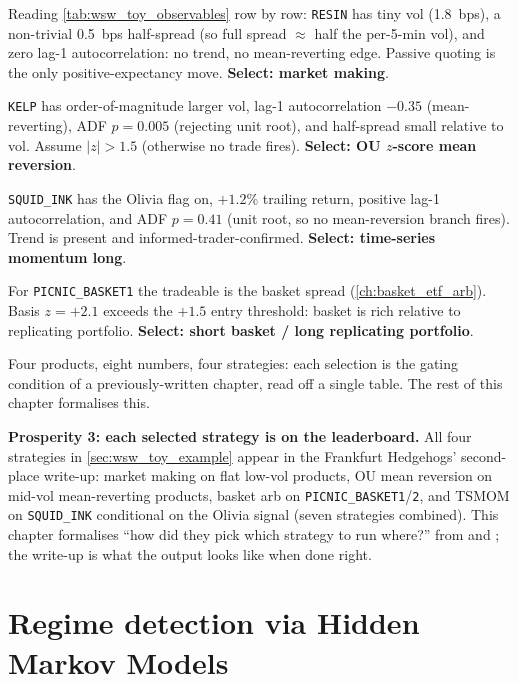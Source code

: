 Reading \cref{tab:wsw_toy_observables} row by row: \texttt{RESIN}
has tiny vol (1.8~bps), a non-trivial 0.5~bps half-spread (so full
spread $\approx$ half the per-5-min vol), and zero lag-1
autocorrelation: no trend, no mean-reverting edge. Passive
quoting is the only positive-expectancy move. \textbf{Select:
market making}.

\texttt{KELP} has order-of-magnitude larger vol, lag-1
autocorrelation $-0.35$ (mean-reverting), ADF $p = 0.005$
(rejecting unit root), and half-spread small relative to vol. Assume
$|z| > 1.5$ (otherwise no trade fires). \textbf{Select: OU
$z$-score mean reversion}.

\texttt{SQUID\_INK} has the Olivia flag on, $+1.2\%$ trailing
return, positive lag-1 autocorrelation, and ADF $p = 0.41$ (unit
root, so no mean-reversion branch fires). Trend is present and
informed-trader-confirmed. \textbf{Select: time-series momentum
long}.

For \texttt{PICNIC\_BASKET1} the tradeable is the basket spread
(\cref{ch:basket_etf_arb}). Basis $z = +2.1$ exceeds the $+1.5$
entry threshold: basket is rich relative to replicating portfolio.
\textbf{Select: short basket / long replicating portfolio}.

Four products, eight numbers, four strategies: each selection is
the gating condition of a previously-written chapter, read off a
single table. The rest of this chapter formalises this.

\begin{prosperitybox}
\textbf{Prosperity 3: each selected strategy is on the leaderboard.}
All four strategies in \cref{sec:wsw_toy_example} appear in the
Frankfurt Hedgehogs' second-place write-up: market making on flat
low-vol products, OU mean reversion on mid-vol mean-reverting
products, basket arb on \texttt{PICNIC\_BASKET1}/\texttt{2}, and
TSMOM on \texttt{SQUID\_INK} conditional on the Olivia signal
(seven strategies combined). This chapter formalises ``how did they
pick which strategy to run where?'' from \citeChanQT{} and
\citep{chan2020cpo}; the write-up is what the output looks like
when done right.
\end{prosperitybox}

\section{Regime detection via Hidden Markov Models}
\label{sec:wsw_hmm}

